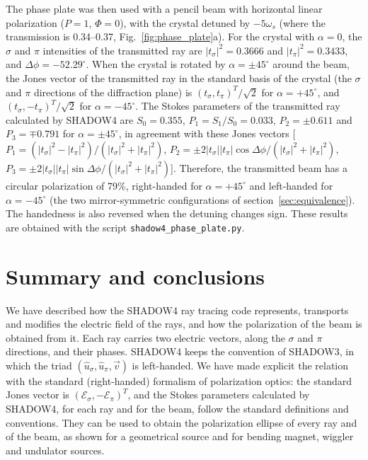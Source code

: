 \documentclass{iucr}
\begin{document}
The phase plate was then used with a pencil beam with horizontal linear polarization ($P=1$, $\Phi=0$), with the crystal detuned by $-5\omega_s$ (where the transmission is 0.34--0.37, Fig.~\ref{fig:phase_plate}a). For the crystal with $\alpha=0$, the $\sigma$ and $\pi$ intensities of the transmitted ray are $|t_\sigma|^2=0.3666$ and $|t_\pi|^2=0.3433$, and $\Delta\phi=-52.29^\circ$. When the crystal is rotated by $\alpha=\pm45^\circ$ around the beam, the Jones vector of the transmitted ray in the standard basis of the crystal (the $\sigma$ and $\pi$ directions of the diffraction plane) is $(t_\sigma, t_\pi)^T/\sqrt{2}$ for $\alpha=+45^\circ$, and $(t_\sigma, -t_\pi)^T/\sqrt{2}$ for $\alpha=-45^\circ$. The Stokes parameters of the transmitted ray calculated by SHADOW4 are $S_0=0.355$, $P_1=S_1/S_0=0.033$, $P_2=\pm0.611$ and $P_3=\mp0.791$ for $\alpha=\pm45^\circ$, in agreement with these Jones vectors [$P_1=(|t_\sigma|^2-|t_\pi|^2)/(|t_\sigma|^2+|t_\pi|^2)$, $P_2=\pm2|t_\sigma||t_\pi|\cos\Delta\phi/(|t_\sigma|^2+|t_\pi|^2)$, $P_3=\pm2|t_\sigma||t_\pi|\sin\Delta\phi/(|t_\sigma|^2+|t_\pi|^2)$]. Therefore, the transmitted beam has a circular polarization of 79\%, right-handed for $\alpha=+45^\circ$ and left-handed for $\alpha=-45^\circ$ (the two mirror-symmetric configurations of section~\ref{sec:equivalence}). The handedness is also reversed when the detuning changes sign. These results are obtained with the script {\tt shadow4\_phase\_plate.py}.


\section{Summary and conclusions}
\label{sec:summary}

We have described how the SHADOW4 ray tracing code represents, transports and modifies the electric field of the rays, and how the polarization of the beam is obtained from it. Each ray carries two electric vectors, along the $\sigma$ and $\pi$ directions, and their phases. SHADOW4 keeps the convention of SHADOW3, in which the triad $(\hat{u}_\sigma,\hat{u}_\pi,\vec{v})$ is left-handed. We have made explicit the relation with the standard (right-handed) formalism of polarization optics: the standard Jones vector is $(\mathcal{E}_\sigma,-\mathcal{E}_\pi)^T$, and the Stokes parameters calculated by SHADOW4, for each ray and for the beam, follow the standard definitions and conventions. They can be used to obtain the polarization ellipse of every ray and of the beam, as shown for a geometrical source and for bending magnet, wiggler and undulator sources.
\end{document}
